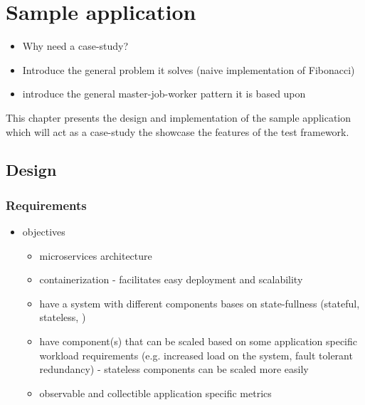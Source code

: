 \chapter{Sample application}

\begin{itemize}
	\item Why need a case-study?
	\item Introduce the general problem it solves (naive implementation of Fibonacci)
	\item introduce the general master-job-worker pattern it is based upon

\end{itemize}

This chapter presents the design and implementation of the sample application which will act as a case-study the showcase the features of the test framework. 


\section{Design}

\subsection{Requirements}

\begin{itemize}
	\item objectives
	\begin{itemize}
		\item microservices architecture
		\item containerization - facilitates easy deployment and scalability
		\item have a system with different components bases on state-fullness (stateful, stateless, )
		\item have component(s) that can be scaled based on some application specific workload requirements (e.g. increased load on the system, fault tolerant redundancy) - stateless components can be scaled more easily
		\item observable and collectible application specific metrics
	\end{itemize}
\end{itemize}

